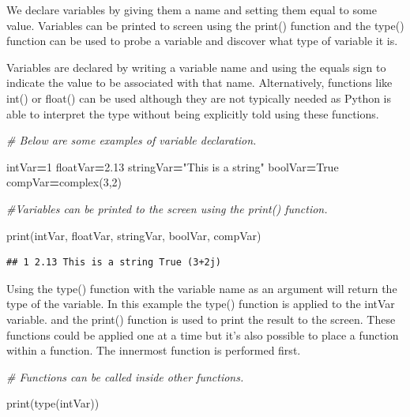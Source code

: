 \documentclass[
]{book}
\newenvironment{Shaded}{\begin{snugshade}}{\end{snugshade}}
\newcommand{\BuiltInTok}[1]{#1}
\newcommand{\CommentTok}[1]{\textcolor[rgb]{0.56,0.35,0.01}{\textit{#1}}}
\newcommand{\DecValTok}[1]{\textcolor[rgb]{0.00,0.00,0.81}{#1}}
\newcommand{\FloatTok}[1]{\textcolor[rgb]{0.00,0.00,0.81}{#1}}
\newcommand{\NormalTok}[1]{#1}
\newcommand{\OperatorTok}[1]{\textcolor[rgb]{0.81,0.36,0.00}{\textbf{#1}}}
\newcommand{\StringTok}[1]{\textcolor[rgb]{0.31,0.60,0.02}{#1}}
\newcommand{\VariableTok}[1]{\textcolor[rgb]{0.00,0.00,0.00}{#1}}
\begin{document}
We declare variables by giving them a name and setting them equal to some value. Variables can be printed to screen using the print() function and the type() function can be used to probe a variable and discover what type of variable it is.

Variables are declared by writing a variable name and using the equals sign to indicate the value to be associated with that name. Alternatively, functions like int() or float() can be used although they are not typically needed as Python is able to interpret the type without being explicitly told using these functions.

\begin{Shaded}
\begin{Highlighting}[]
\CommentTok{\# Below are some examples of variable declaration.}

\NormalTok{intVar}\OperatorTok{=}\DecValTok{1}
\NormalTok{floatVar}\OperatorTok{=}\FloatTok{2.13}
\NormalTok{stringVar}\OperatorTok{=}\StringTok{"This is a string"}
\NormalTok{boolVar}\OperatorTok{=}\VariableTok{True}
\NormalTok{compVar}\OperatorTok{=}\BuiltInTok{complex}\NormalTok{(}\DecValTok{3}\NormalTok{,}\DecValTok{2}\NormalTok{)}

\CommentTok{\#Variables can be printed to the screen using the print() function. }

\BuiltInTok{print}\NormalTok{(intVar, floatVar, stringVar, boolVar, compVar)}
\end{Highlighting}
\end{Shaded}

\begin{verbatim}
## 1 2.13 This is a string True (3+2j)
\end{verbatim}

Using the type() function with the variable name as an argument will return the type of the variable. In this example the type() function is applied to the intVar variable. and the print() function is used to print the result to the screen. These functions could be applied one at a time but it's also possible to place a function within a function. The innermost function is performed first.

\begin{Shaded}
\begin{Highlighting}[]
\CommentTok{\# Functions can be called inside other functions.}

\BuiltInTok{print}\NormalTok{(}\BuiltInTok{type}\NormalTok{(intVar))}
\end{Highlighting}
\end{Shaded}
\end{document}
